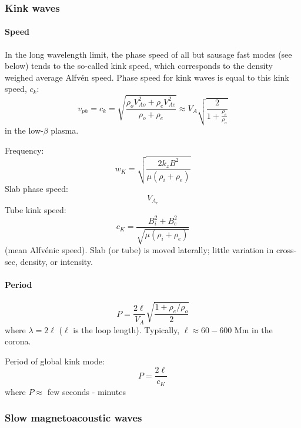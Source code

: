 
\subsubsection{Kink waves}

\paragraph{Speed}
In the long wavelength limit, the phase speed of all but sausage fast modes
(see below) tends to the so-called kink speed, which corresponds to the density
weighed average Alfv\'en speed.
Phase speed for kink waves is equal to this kink speed, $c_{k}$:
\[
    v_{ph}
    = c_{k}
    = \sqrt{\frac{\rho_{o}V^{2}_{Ao}+\rho_{e}V^{2}_{Ae}} {\rho_o+\rho_e}}
    \approx V_{A}\sqrt{\frac{2}{1 + \frac{\rho_{e}}{\rho_{o}}}}
    \]
in the low-$\beta$ plasma.

Frequency:
\[
    w_{K} = \sqrt{ \frac{2k_{z}B^{2}}{\mu(\rho_{i}+\rho_{e})}  }
    \]
Slab phase speed:
\[
    V_{A_{e}}
    \]
Tube kink speed:
\[
    c_{K} = \frac{B_{i}^{2} + B_{e}^{2}}{\sqrt{\mu(\rho_{i}+\rho_{e})}}
    \]
(mean Alfv\'enic speed). Slab (or tube) is moved laterally; little variation in
cross-sec, density, or intensity.

\paragraph{Period}
\[
    P = \frac{2\ell}{V_A}\sqrt{\frac{1+\rho_e/\rho_o}{2}}
    \]
where $\lambda=2\ell$ ($\ell$ is the loop length).
Typically, $\ell \approx 60-600$ Mm in the corona.

Period of global kink mode:
\[
    P = \frac{2\ell}{c_{K}}
    \]
where $P \approx $ few seconds - minutes


\subsubsection{Slow magnetoacoustic waves}



